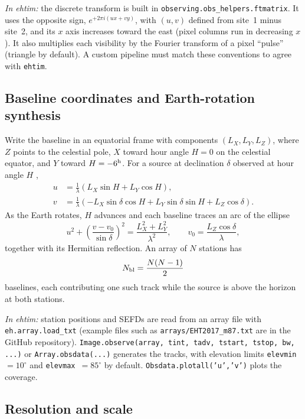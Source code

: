\documentclass[11pt]{article}
\newcommand{\ehtimnote}[1]{%
  \par\smallskip\noindent
  \colorbox{gray!12}{\parbox{\dimexpr\linewidth-2\fboxsep}{\small\textit{In ehtim:} #1}}%
  \par\smallskip}
\begin{document}
\ehtimnote{the discrete transform is built in
\texttt{observing.obs\_helpers.ftmatrix}. It uses the opposite sign,
$e^{+2\pi i(ux+vy)}$, with $(u,v)$ defined from site~1 minus site~2, and its
$x$ axis increases toward the east (pixel columns run in decreasing $x$). It
also multiplies each visibility by the Fourier transform of a pixel ``pulse''
(triangle by default). A custom pipeline must match these conventions to agree
with \texttt{ehtim}.}

\subsection{Baseline coordinates and Earth-rotation synthesis}

Write the baseline in an equatorial frame with components
$(L_X, L_Y, L_Z)$, where $Z$ points to the celestial pole, $X$ toward hour
angle $H = 0$ on the celestial equator, and $Y$ toward $H = -6^{\rm h}$. For a
source at declination $\delta$ observed at hour angle $H$ \cite{TMS2017},
\begin{align}
u &= \frac{1}{\lambda}\left(L_X\sin H + L_Y\cos H\right), \\
v &= \frac{1}{\lambda}\left(-L_X\sin\delta\cos H + L_Y\sin\delta\sin H + L_Z\cos\delta\right).
\end{align}
As the Earth rotates, $H$ advances and each baseline traces an arc of the
ellipse
\begin{equation}
u^2 + \left(\frac{v - v_0}{\sin\delta}\right)^2 = \frac{L_X^2 + L_Y^2}{\lambda^2},
\qquad v_0 = \frac{L_Z\cos\delta}{\lambda},
\end{equation}
together with its Hermitian reflection. An array of $N$ stations has
\begin{equation}
N_{\rm bl} = \frac{N(N-1)}{2}
\end{equation}
baselines, each contributing one such track while the source is above the
horizon at both stations.

\ehtimnote{station positions and SEFDs are read from an array file with
\texttt{eh.array.load\_txt} (example files such as
\texttt{arrays/EHT2017\_m87.txt} are in the GitHub repository).
\texttt{Image.observe(array, tint, tadv, tstart, tstop, bw, ...)} or
\texttt{Array.obsdata(...)} generates the tracks, with elevation limits
\texttt{elevmin}~$=10^\circ$ and \texttt{elevmax}~$=85^\circ$ by default.
\texttt{Obsdata.plotall('u','v')} plots the coverage.}

\subsection{Resolution and scale}
\end{document}
